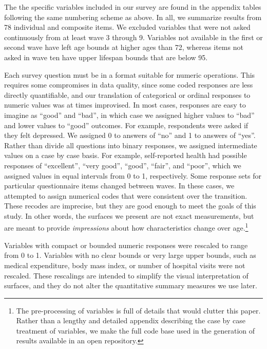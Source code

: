 \documentclass[11pt,oneside]{article} %
\begin{document}
The the specific variables included in our survey are found in the appendix
tables following the same numbering scheme as above. In all, we summarize
results from 78 individual and composite items.
We excluded variables that were not asked continuously from at least wave 3 through 9. Variables not available in the
first or second wave have left age bounds at higher ages than 72, whereas items
not asked in wave ten have upper lifespan bounds that are below 95.

Each survey question must be in a format suitable for numeric operations.
This requires some compromises in data quality, since some coded responses are less directly
quantifiable, and our translation of categorical or ordinal responses to numeric
values was at times improvised. In most cases, responses are easy to imagine as
``good'' and ``bad'', in which case we assigned higher values to ``bad'' and
lower values to ``good'' outcomes. For example, respondents were asked if they
felt depressed. We assigned 0 to answers of ``no'' and 1 to answers of ``yes''.
Rather than divide all questions into binary responses, we assigned intermediate
values on a case by case basis. For example, self-reported health
had possible responses of ``excellent'', ``very good'', ``good'',
``fair'', and ``poor'', which we assigned values in equal intervals
from 0 to 1, respectively. Some response
sets for particular questionnaire items changed between
waves.
In these cases, we attempted to assign numerical codes that were consistent
over the transition. These recodes are imprecise, but they are good enough
to meet the goals of this study. In other words, the surfaces we
present are not exact measurements, but are meant to provide
\textit{impressions} about how characteristics change over age.\footnote{The
pre-processing of variables is full of details that would clutter this paper.
Rather than a lengthy and detailed appendix describing the case by case
treatment of variables, we make the full code base used in the generation of
results available in an open repository.}

Variables with compact or bounded numeric responses were rescaled to range from
0 to 1. Variables with no clear bounds or very large upper
bounds, such as medical expenditure, body mass index, or number of hospital
visits were not rescaled. These rescalings are intended to simplify
the visual interpretation of surfaces, and they do not alter the
quantitative summary measures we use later. 
\end{document}
